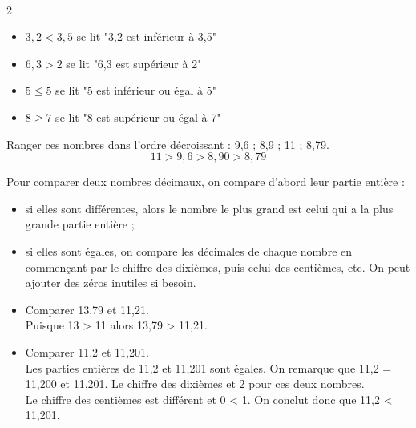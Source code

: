 \begin{Exemples}
$ $
\vspace{-1cm}
\begin{multicols}{2}
\begin{itemize}
\item $3,2<3,5$ se lit "3,2 est inférieur à 3,5"
\item $6,3>2$ se lit "6,3 est supérieur à 2"
\item $5\leq5$ se lit "5 est inférieur ou égal à 5"
\item $8\geq7$ se lit "8 est supérieur ou égal à 7"
\end{itemize}
\end{multicols}
\vspace{-0.5cm}
\end{Exemples}


\begin{Exemple}
Ranger ces nombres dans l'ordre décroissant : 9,6 ; 8,9 ; 11 ; 8,79. 
$$11 > 9,6 > 8,90> 8,79$$

\end{Exemple}

\begin{Méthode}
Pour comparer deux nombres décimaux, on compare d'abord leur partie entière :
\begin{itemize}[label=\textcolor{Couleur7}{$\bullet$}]
\item si elles sont différentes, alors le nombre le plus grand est celui qui a la plus grande partie entière ;
\item si elles sont égales, on compare les décimales de chaque nombre en commençant par le chiffre des dixièmes, puis celui des centièmes, etc. On peut ajouter des zéros inutiles si besoin.
\end{itemize}
\end{Méthode}



\begin{Exemples}
\begin{itemize}
\item Comparer 13,79 et 11,21. \\
Puisque 13 > 11 alors 13,79 > 11,21.

\item Comparer 11,2 et 11,201. \\
Les parties entières de 11,2 et 11,201 sont égales. On remarque que 11,2 = 11,200 et 11,201. Le chiffre des dixièmes et 2 pour ces deux nombres. \\Le chiffre des centièmes est différent et 0 < 1. On conclut donc que 11,2 < 11,201.
\end{itemize}
\end{Exemples}

